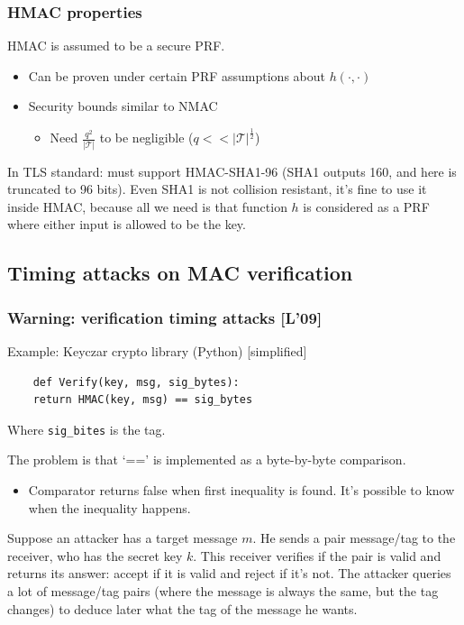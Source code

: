 \documentclass[12pt]{book}
\begin{document}
\subsubsection{HMAC properties}
HMAC is assumed to be a secure PRF.
\begin{itemize}
	\item Can be proven under certain PRF assumptions about $h(\cdot,\cdot)$
	\item Security bounds similar to NMAC
	\begin{itemize}
		\item Need $\frac{q^{2}}{|\mathcal{T}|}$ to be negligible ($q<<|\mathcal{T}|^{\frac{1}{2}}$)
	\end{itemize}
\end{itemize}

In TLS standard: must support HMAC-SHA1-96 (SHA1 outputs 160, and here is truncated to 96 bits). Even SHA1 is not collision resistant, it's fine to use it inside HMAC, because all we need is that function $h$ is considered as a PRF where either input is allowed to be the key.

\subsection{Timing attacks on MAC verification}
\subsubsection{Warning: verification timing attacks [L'09]}
Example: Keyczar crypto library (Python) [simplified]
\begin{verbatim}
	def Verify(key, msg, sig_bytes):
	return HMAC(key, msg) == sig_bytes
\end{verbatim}Where \verb|sig_bites| is the tag.

The problem is that `==' is implemented as a byte-by-byte comparison.
\begin{itemize}
	\item Comparator returns false when first inequality is found. It's possible to know when the inequality happens.
\end{itemize}

Suppose an attacker has a target message $m$. He sends a pair message/tag to the receiver, who has the secret key $k$. This receiver verifies if the pair is valid and returns its answer: accept if it is valid and reject if it's not. The attacker queries a lot of message/tag pairs (where the message is always the same, but the tag changes) to deduce later what the tag of the message he wants.
\end{document}
